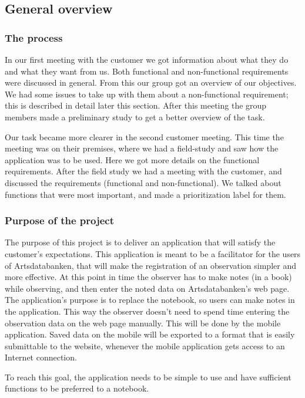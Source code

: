 \subsection{General overview}

\subsubsection{ The process}
In our first meeting with the customer we got information about what they do and what they want from us.
Both functional and non-functional requirements were discussed in general.
From this our group got an overview of our objectives.
We had some issues to take up with them about a non-functional requirement; this is described in detail later this section.
After this meeting the group members made a preliminary study to get a better overview of the task.

Our task became more clearer in the second customer meeting.
This time the meeting was on their premises, where we had a field-study and saw how the
application was to be used. Here we got more details on the functional requirements.
After the field study we had a meeting with the customer, and discussed the requirements
(functional and non-functional). We talked about functions that were most important,
and made a prioritization label for them.

\subsubsection{Purpose of the project}

The purpose of this project is to deliver an application that will satisfy the customer's expectations.
This application is meant to be a facilitator for the users of Artsdatabanken,
that will make the registration of an observation simpler and more effective.
At this point in time the observer has to make notes (in a book) while observing,
and then enter the noted data on Artsdatabanken's web page.
The application's purpose is to replace the notebook, so users can make notes in the application.
This way the observer doesn't need to spend time entering the observation data on the web page manually.
This will be done by the mobile application. Saved data on the mobile will be exported to a format
that is easily submittable to the website, whenever the mobile application gets access to an Internet connection.

To reach this goal, the application needs to be simple to use and have sufficient functions to be preferred to a notebook.



